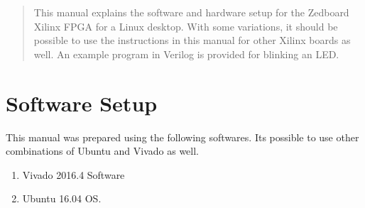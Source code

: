 \documentclass[journal,12pt,twocolumn]{IEEEtran}
\begin{document}
\tableofcontents

\bigskip

\begin{abstract}
This manual explains the software and hardware setup for the Zedboard Xilinx FPGA for a Linux desktop.  With some variations, it should be possible to use the instructions in this manual for other Xilinx boards as well. An example program in Verilog is provided for blinking an LED.
%
\end{abstract}




%
\IEEEpeerreviewmaketitle


%
%

\section{Software Setup}
This manual was prepared using the following softwares.  Its possible to use other combinations of Ubuntu and Vivado as well.
\begin{enumerate}
\item Vivado 2016.4 Software

\item Ubuntu 16.04 OS.
\end{enumerate}
\end{document}
